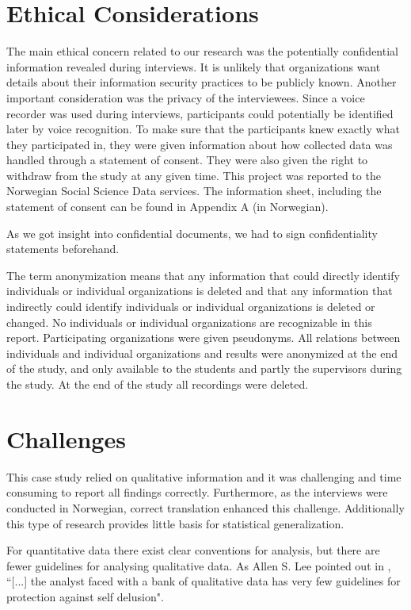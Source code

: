 \section{Ethical Considerations}
\label{sec:ethical}
The main ethical concern related to our research was the potentially confidential information revealed during interviews. It is unlikely that organizations want details about their information security practices to be publicly known. Another important consideration was the privacy of the interviewees. Since a voice recorder was used during interviews, participants could potentially be identified later by voice recognition. To make sure that the participants knew exactly what they participated in, they were given information about how collected data was handled through a statement of consent. They were also given the right to withdraw from the study at any given time. This project was reported to the Norwegian Social Science Data services. The information sheet, including the statement of consent can be found in Appendix A (in Norwegian). 

As we got insight into confidential documents, we had to sign confidentiality statements beforehand.

The term anonymization means that any information that could directly identify individuals or individual organizations is deleted and that any information that indirectly could identify individuals or individual organizations is deleted or changed. No individuals or individual organizations are recognizable in this report. Participating organizations were given pseudonyms. All relations between individuals and individual organizations and results were anonymized at the end of the study, and only available to the students and partly the supervisors during the study. At the end of the study all recordings were deleted.

\section{Challenges}
\label{sec:challenges}
This case study relied on qualitative information and it was challenging and time consuming to report all findings correctly. Furthermore, as the interviews were conducted in Norwegian, correct translation enhanced this challenge. Additionally this type of research provides little basis for statistical generalization. \cite{CaseStudyResearch}

For quantitative data there exist clear conventions for analysis, but there are fewer guidelines for analysing qualitative data. As Allen S. Lee pointed out in \cite{lee1989scientific}, ``[...] the analyst faced with a bank of qualitative data has very few guidelines for protection against self delusion".

